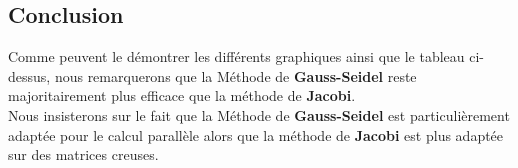 \subsection{Conclusion}
Comme peuvent le démontrer les différents graphiques ainsi que le tableau ci-dessus, nous remarquerons que la Méthode de \textbf{Gauss-Seidel} reste majoritairement plus efficace que la méthode de \textbf{Jacobi}. \\
Nous insisterons sur le fait que la Méthode de \textbf{Gauss-Seidel} est particulièrement adaptée pour le calcul parallèle alors que la méthode de \textbf{Jacobi} est plus adaptée sur des matrices creuses.
% 